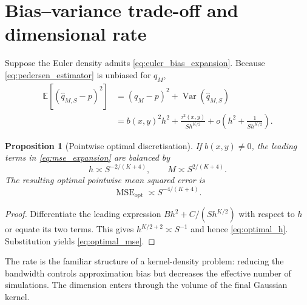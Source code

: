 \documentclass[11pt]{article}
\newtheorem{proposition}[proposition]{Proposition}
\theoremstyle{definition}
\newcommand{\E}{\mathbb{E}}
\newcommand{\Var}{\operatorname{Var}}
\begin{document}
\FloatBarrier
\section{Bias--variance trade-off and dimensional rate}\label{sec:mse}

Suppose the Euler density admits \eqref{eq:euler_bias_expansion}. Because \eqref{eq:pedersen_estimator} is unbiased for $q_M$,
\begin{align}
\E\!\left[(\widehat q_{M,S}-p)^2\right]
&=(q_M-p)^2+\Var(\widehat q_{M,S}) \nonumber\\
&=b(x,y)^2h^2
+\frac{\tau^2(x,y)}{S h^{K/2}}
+o\!\left(h^2+\frac{1}{S h^{K/2}}\right). \label{eq:mse_expansion}
\end{align}

\begin{proposition}[Pointwise optimal discretisation]\label{prop:optimal_m}
If $b(x,y)\ne0$, the leading terms in \eqref{eq:mse_expansion} are balanced by
\begin{equation}\label{eq:optimal_h}
h\asymp S^{-2/(K+4)},
\qquad
M\asymp S^{2/(K+4)}.
\end{equation}
The resulting optimal pointwise mean squared error is
\begin{equation}\label{eq:optimal_mse}
\operatorname{MSE}_{\mathrm{opt}}
\asymp S^{-4/(K+4)}.
\end{equation}
\end{proposition}

\begin{proof}
Differentiate the leading expression $B h^2+C/(S h^{K/2})$ with respect to $h$ or equate its two terms. This gives $h^{K/2+2}\asymp S^{-1}$ and hence \eqref{eq:optimal_h}. Substitution yields \eqref{eq:optimal_mse}.
\end{proof}

The rate is the familiar structure of a kernel-density problem: reducing the bandwidth controls approximation bias but decreases the effective number of simulations. The dimension enters through the volume of the final Gaussian kernel.
\end{document}
